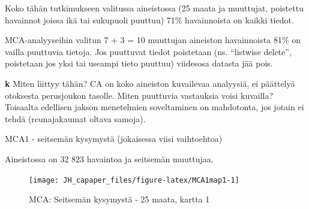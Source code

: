 \documentclass[
  finnish,
]{book}
\newenvironment{Shaded}{\begin{snugshade}}{\end{snugshade}}
\newcommand{\CommentTok}[1]{\textcolor[rgb]{0.56,0.35,0.01}{\textit{#1}}}
\begin{document}
\begin{Shaded}
\end{Shaded}

Koko tähän tutkimukseen valitussa aineistossa (25 maata ja muuttujat, poistettu
havainnot joissa ikä tai sukupuoli puuttuu) 71\% havainnoista on kaikki tiedot.

MCA-analyyseihin valitun 7 + 3 = 10 muuttujan aineiston havainnoista 81\% on
vailla puuttuvia tietoja. Jos puuttuvat tiedot poistetaan (ns. ``listwise delete'',
poistetaan jos yksi tai useampi tieto puuttuu) viidesosa datasta jää pois.

\textbf{k} Miten liittyy tähän? CA on koko aineiston kuvailevaa analyysiä, ei päättelyä
otoksesta perusjoukon tasolle. Miten puuttuvia vastauksia voisi kuvailla? Toisaalta
edellisen jakson menetelmien soveltaminen on mahdotonta, jos jotain ei tehdä
(reunajakaumat oltava samoja).

MCA1 - seitsemän kysymystä (jokaisessa viisi vaihtoehtoa)

Aineistossa on 32 823 havaintoa ja seitsemän muuttujaa.

\begin{figure}

{\centering \texttt{[image: JH\_capaper\_files/figure-latex/MCA1map1-1]} 

}

\caption{MCA: Seitsemän kysymystä - 25 maata, kartta 1}\label{fig:MCA1map1}
\end{figure}
\end{document}
